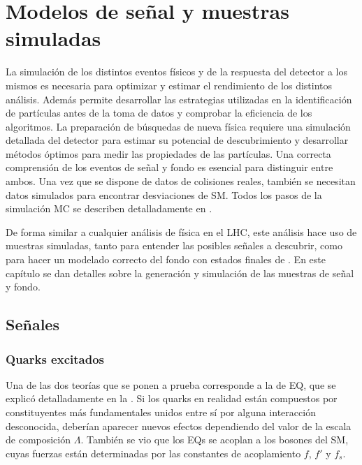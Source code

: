 \chapter{Modelos de se\~nal y muestras simuladas}
\label{ch:samples}


La simulación de los distintos eventos físicos y de la respuesta del detector a los mismos es necesaria para optimizar y estimar el rendimiento de los distintos análisis. Además permite desarrollar las estrategias utilizadas en la identificación de partículas antes de la toma de datos y comprobar la eficiencia de los algoritmos. La preparación de búsquedas de nueva física requiere una simulación detallada del detector para estimar su potencial de descubrimiento y desarrollar métodos óptimos para medir las propiedades de las partículas. Una correcta comprensión de los eventos de señal y fondo es esencial para distinguir entre ambos. Una vez que se dispone de datos de colisiones reales, también se necesitan datos simulados para encontrar desviaciones de \ac{SM}. Todos los pasos de la simulación \ac{MC} se describen detalladamente en \Sect{\ref{sec:theory:mc_simulation}}.

De forma similar a cualquier análisis de física en el \ac{LHC}, este análisis hace uso de muestras simuladas, tanto para entender las posibles señales a descubrir, como para hacer un modelado correcto del fondo con estados finales de \gammajet.
En este capítulo se dan detalles sobre la generación y simulación de las muestras de señal y fondo.


\section{Se\~nales}
\label{sec:samples:samples:sig}

\subsection{Quarks excitados}
\label{subsec:samples:samples:sig:qstar}

Una de las dos teorías que se ponen a prueba corresponde a la de \acf{EQ}, que se explicó detalladamente en la \Sect{\ref{subsec:theory:bsm:qstar}}. Si los quarks en realidad están compuestos por constituyentes m\'as fundamentales unidos entre sí por alguna interacción desconocida, deberían aparecer nuevos efectos dependiendo del valor de la escala de composición \(\Lambda\).
También se vio que los \acp{EQ} se acoplan a los bosones del \ac{SM}, cuyas fuerzas están determinadas por las constantes de acoplamiento \(f\), \(f'\) y \(f_s\).

